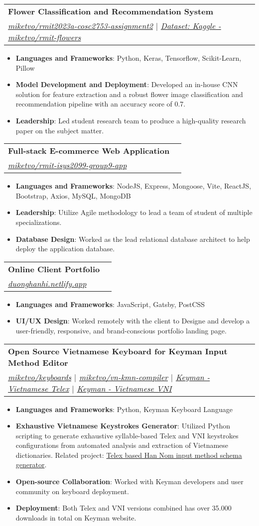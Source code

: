\documentclass[a4paper,11pt]{article}
\makeatletter
\newcommand{\resumeItem}[2]{
  \item\small{
    \textbf{#1}{: #2 \vspace{-2pt}}
  }
}
\newcommand{\resumeSubheading}[4]{
  \vspace{-2pt}\item
    \begin{tabular*}{0.97\textwidth}{l@{\extracolsep{\fill}}r}
      \textbf{#1} & #2 \\
      \textit{\small#3} & \textit{\small #4} \\
    \end{tabular*}\vspace{-6pt}
}
\newcommand{\resumeItemListStart}{\begin{itemize}}
\newcommand{\resumeItemListEnd}{\end{itemize}\vspace{-6pt}}
\makeatother
\begin{document}
    \resumeSubheading
      {Flower Classification and Recommendation System}{}
      {\href{https://github.com/miketvo/rmit2023a-cosc2753-assignment2}{\faGithub\space miketvo/rmit2023a-cosc2753-assignment2} $|$ \href{https://www.kaggle.com/datasets/miketvo/rmit-flowers/}{\faDatabase\space Dataset: Kaggle - miketvo/rmit-flowers}}{}
      \resumeItemListStart
        \resumeItem{Languages and Frameworks}
          {Python, Keras, Tensorflow, Scikit-Learn, Pillow}
        \resumeItem{Model Development and Deployment}
          {Developed an in-house CNN solution for feature extraction and a robust flower image classification and recommendation pipeline with an accuracy score of 0.7.}
        \resumeItem{Leadership}
          {Led student research team to produce a high-quality research paper on the subject matter.}
      \resumeItemListEnd

    \resumeSubheading
      {Full-stack E-commerce Web Application}{}
      {\href{https://github.com/miketvo/rmit-isys2099-group9-app}{\faGithub\space miketvo/rmit-isys2099-group9-app}}{}
      \resumeItemListStart
        \resumeItem{Languages and Frameworks}
          {NodeJS, Express, Mongoose, Vite, ReactJS, Bootstrap, Axios, MySQL, MongoDB}
        \resumeItem{Leadership}
          {Utilize Agile methodology to lead a team of student of multiple specializations.}
        \resumeItem{Database Design}
          {Worked as the lead relational database architect to help deploy the application database.} 
      \resumeItemListEnd

    \resumeSubheading
      {Online Client Portfolio}{}
      {\href{https://duonghanhi.netlify.app/}{\faGlobe\space duonghanhi.netlify.app}}{}
      \resumeItemListStart
        \resumeItem{Languages and Frameworks}
          {JavaScript, Gatsby, PostCSS}
        \resumeItem{UI/UX Design}
          {Worked remotely with the client to Designe and develop a user-friendly, responsive, and brand-conscious portfolio landing page.}
      \resumeItemListEnd

      \resumeSubheading
      {Open Source Vietnamese Keyboard for Keyman Input Method Editor}{}
      {\href{https://github.com/miketvo/keyboards}{\faGithub\space miketvo/keyboards} $|$ \href{https://github.com/miketvo/vn-kmn-compiler}{\faGithub\space miketvo/vn-kmn-compiler} $|$ \href{https://keyman.com/keyboards/vietnamese_telex}{\faGlobe\space Keyman - Vietnamese Telex} $|$ \href{https://keyman.com/keyboards/vietnamese_vni}{\faGlobe\space Keyman - Vietnamese VNI}}{}
      \resumeItemListStart
        \resumeItem{Languages and Frameworks}
          {Python, Keyman Keyboard Language}
        \resumeItem{Exhaustive Vietnamese Keystrokes Generator}
          {Utilized Python scripting to generate exhaustive syllable-based Telex and VNI keystrokes configurations from automated analysis and extraction of Vietnamese dictionaries. Related project: \href{https://github.com/miketvo/rime-ime-han-nom-data}{\faGithub\space Telex based Han Nom input method schema generator}.}
        \resumeItem{Open-source Collaboration}
          {Worked with Keyman developers and user community on keyboard deployment.}
        \resumeItem{Deployment}
          {Both Telex and VNI versions combined has over 35.000 downloads in total on Keyman website.}
      \resumeItemListEnd
\end{document}
